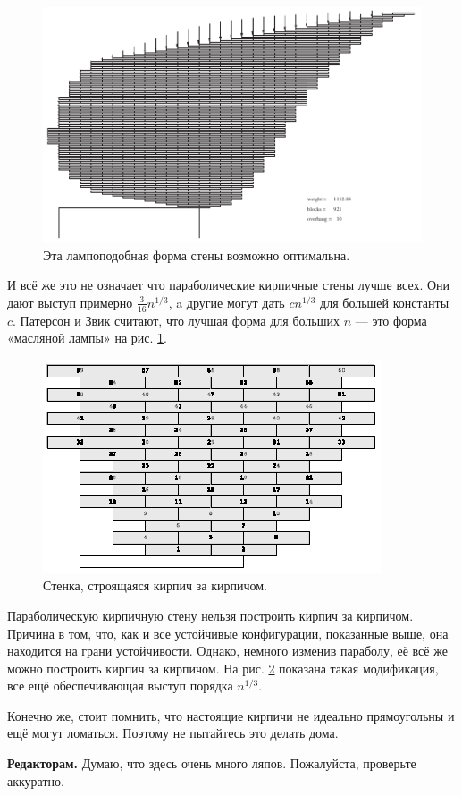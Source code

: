 \begin{figure}[htb!]
\centering
\includegraphics[scale=1]{pics/kirpich8}
\caption{Эта лампоподобная форма стены возможно оптимальна.}
\label{pic:kirpich8}
\end{figure}

И всё же это не означает что параболические кирпичные стены лучше всех.
Они дают выступ примерно $\tfrac3{16}n^{1/3}$, a другие могут дать $cn^{1/3}$ для большей константы $c$.
Патерсон и Звик считают, что лучшая форма для больших $n$ --- это форма «масляной лампы» на рис. \ref{pic:kirpich8}.

\begin{figure}[htb!]
\centering
\includegraphics[scale=1]{pics/kirpich9}
\caption{Стенка, строящаяся кирпич за кирпичом.}
\label{pic:kirpich9}
\end{figure}

Параболическую кирпичную стену нельзя построить кирпич за кирпичом.
Причина в том, что, как и все устойчивые конфигурации, показанные выше, она находится на грани устойчивости.
Однако, немного изменив параболу, её всё же можно построить кирпич за кирпичом.
На рис. \ref{pic:kirpich9} показана такая модификация, все ещё обеспечивающая выступ порядка $n^{1/3}$.

Конечно же, стоит помнить, что настоящие кирпичи не идеально прямоугольны и ещё могут ломаться.
Поэтому не пытайтесь это делать дома.

\begin{addedbytheeditors}
\textbf{Редакторам.}
Думаю, что здесь очень много ляпов. Пожалуйста, проверьте аккуратно.
\end{addedbytheeditors}

